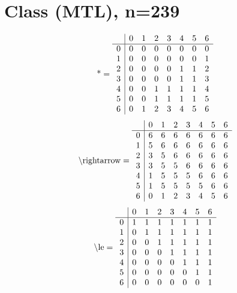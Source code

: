 \documentclass[11pt]{article}
\begin{document}
\section{Class (MTL), n=239}
\[\text{*} = 
\begin{array}{r | r r r r r r r}
 & 0 & 1 & 2 & 3 & 4 & 5 & 6 \\ \hline
0 & 0 & 0 & 0 & 0 & 0 & 0 & 0 \\
1 & 0 & 0 & 0 & 0 & 0 & 0 & 1 \\
2 & 0 & 0 & 0 & 0 & 1 & 1 & 2 \\
3 & 0 & 0 & 0 & 0 & 1 & 1 & 3 \\
4 & 0 & 0 & 1 & 1 & 1 & 1 & 4 \\
5 & 0 & 0 & 1 & 1 & 1 & 1 & 5 \\
6 & 0 & 1 & 2 & 3 & 4 & 5 & 6 \\
\end{array}
\]
\[\text{\textbackslash rightarrow} = 
\begin{array}{r | r r r r r r r}
 & 0 & 1 & 2 & 3 & 4 & 5 & 6 \\ \hline
0 & 6 & 6 & 6 & 6 & 6 & 6 & 6 \\
1 & 5 & 6 & 6 & 6 & 6 & 6 & 6 \\
2 & 3 & 5 & 6 & 6 & 6 & 6 & 6 \\
3 & 3 & 5 & 5 & 6 & 6 & 6 & 6 \\
4 & 1 & 5 & 5 & 5 & 6 & 6 & 6 \\
5 & 1 & 5 & 5 & 5 & 5 & 6 & 6 \\
6 & 0 & 1 & 2 & 3 & 4 & 5 & 6 \\
\end{array}
\]
\[\text{\textbackslash le} = 
\begin{array}{r | r r r r r r r}
 & 0 & 1 & 2 & 3 & 4 & 5 & 6 \\ \hline
0 & 1 & 1 & 1 & 1 & 1 & 1 & 1 \\
1 & 0 & 1 & 1 & 1 & 1 & 1 & 1 \\
2 & 0 & 0 & 1 & 1 & 1 & 1 & 1 \\
3 & 0 & 0 & 0 & 1 & 1 & 1 & 1 \\
4 & 0 & 0 & 0 & 0 & 1 & 1 & 1 \\
5 & 0 & 0 & 0 & 0 & 0 & 1 & 1 \\
6 & 0 & 0 & 0 & 0 & 0 & 0 & 1 \\
\end{array}
\]
\end{document}
